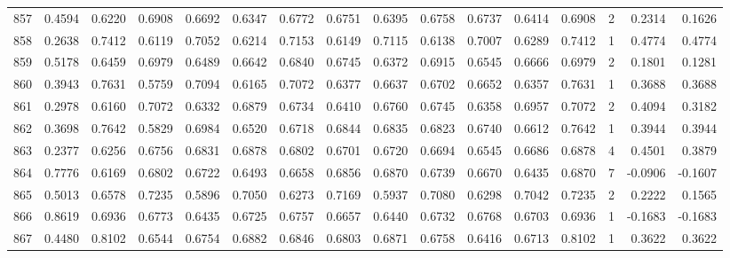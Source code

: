 \begin{tabular}{lrrrrrrrrrrrrrrr}
857 &      0.4594 &  0.6220 &  0.6908 &  0.6692 &  0.6347 &  0.6772 &  0.6751 &  0.6395 &  0.6758 &  0.6737 &   0.6414 &     0.6908 &      2 &                    0.2314 &                     0.1626 \\
858 &      0.2638 &  0.7412 &  0.6119 &  0.7052 &  0.6214 &  0.7153 &  0.6149 &  0.7115 &  0.6138 &  0.7007 &   0.6289 &     0.7412 &      1 &                    0.4774 &                     0.4774 \\
859 &      0.5178 &  0.6459 &  0.6979 &  0.6489 &  0.6642 &  0.6840 &  0.6745 &  0.6372 &  0.6915 &  0.6545 &   0.6666 &     0.6979 &      2 &                    0.1801 &                     0.1281 \\
860 &      0.3943 &  0.7631 &  0.5759 &  0.7094 &  0.6165 &  0.7072 &  0.6377 &  0.6637 &  0.6702 &  0.6652 &   0.6357 &     0.7631 &      1 &                    0.3688 &                     0.3688 \\
861 &      0.2978 &  0.6160 &  0.7072 &  0.6332 &  0.6879 &  0.6734 &  0.6410 &  0.6760 &  0.6745 &  0.6358 &   0.6957 &     0.7072 &      2 &                    0.4094 &                     0.3182 \\
862 &      0.3698 &  0.7642 &  0.5829 &  0.6984 &  0.6520 &  0.6718 &  0.6844 &  0.6835 &  0.6823 &  0.6740 &   0.6612 &     0.7642 &      1 &                    0.3944 &                     0.3944 \\
863 &      0.2377 &  0.6256 &  0.6756 &  0.6831 &  0.6878 &  0.6802 &  0.6701 &  0.6720 &  0.6694 &  0.6545 &   0.6686 &     0.6878 &      4 &                    0.4501 &                     0.3879 \\
864 &      0.7776 &  0.6169 &  0.6802 &  0.6722 &  0.6493 &  0.6658 &  0.6856 &  0.6870 &  0.6739 &  0.6670 &   0.6435 &     0.6870 &      7 &                   -0.0906 &                    -0.1607 \\
865 &      0.5013 &  0.6578 &  0.7235 &  0.5896 &  0.7050 &  0.6273 &  0.7169 &  0.5937 &  0.7080 &  0.6298 &   0.7042 &     0.7235 &      2 &                    0.2222 &                     0.1565 \\
866 &      0.8619 &  0.6936 &  0.6773 &  0.6435 &  0.6725 &  0.6757 &  0.6657 &  0.6440 &  0.6732 &  0.6768 &   0.6703 &     0.6936 &      1 &                   -0.1683 &                    -0.1683 \\
867 &      0.4480 &  0.8102 &  0.6544 &  0.6754 &  0.6882 &  0.6846 &  0.6803 &  0.6871 &  0.6758 &  0.6416 &   0.6713 &     0.8102 &      1 &                    0.3622 &                     0.3622 \\

\end{tabular}
